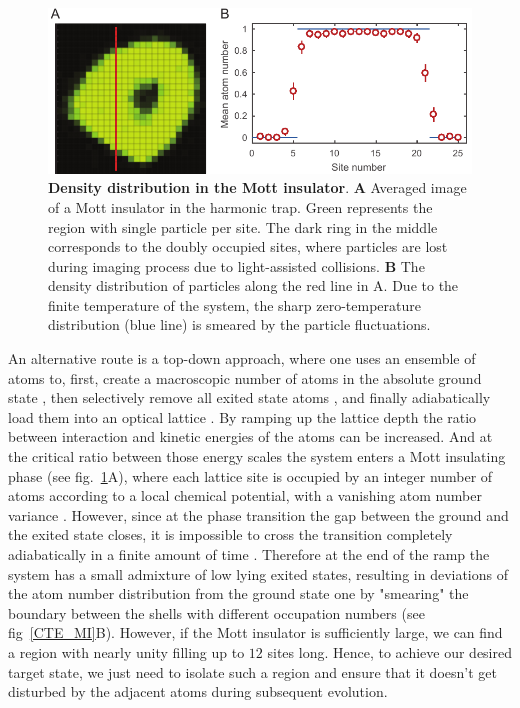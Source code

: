 \begin{figure}[t]
	\centering
	\includegraphics[scale=1]{figures/CTE_MI.pdf}
	\caption{{\bf Density distribution in the Mott insulator}. {\bf A} Averaged image of a Mott insulator in the harmonic trap. Green represents the region with single particle per site. The dark ring in the middle corresponds to the doubly occupied sites, where particles are lost during imaging process due to light-assisted collisions. {\bf B} The density distribution of particles along the red line in A. Due to the finite temperature of the system, the sharp zero-temperature distribution (blue line) is smeared by the particle fluctuations.}
	\label{fig:CTE_MI}
\end{figure}

An alternative route is a top-down approach, where one uses an ensemble of atoms to, first, create a macroscopic number of atoms in the absolute ground state \cite{BEC, DFG}, then selectively remove all exited state atoms \cite{ammy's thesis}, and finally adiabatically load them into an optical lattice \cite{Greiner2002}. By ramping up the lattice depth the ratio between interaction and kinetic energies of the atoms can be increased. And at the critical ratio between those energy scales the system enters a Mott insulating phase (see fig.~\ref{fig:CTE_MI}A), where each lattice site is occupied by an integer number of atoms according to a local chemical potential, with a vanishing atom number variance \cite{Bakr2010, Bloch MI}. However, since at the phase transition the gap between the ground and the exited state closes, it is impossible to cross the transition completely adiabatically in a finite amount of time \cite{subir phase transition}. Therefore at the end of the ramp the system has a small admixture of low lying exited states, resulting in  deviations of the atom number distribution from the ground state one by "smearing" the boundary between the shells with different occupation numbers (see fig~\ref{CTE_MI}B). However, if the Mott insulator is sufficiently large, we can find a region with nearly unity filling up to $12$ sites long. Hence, to achieve our desired target state, we just need to isolate such a region and ensure that it doesn't get disturbed by the adjacent atoms during subsequent evolution.

